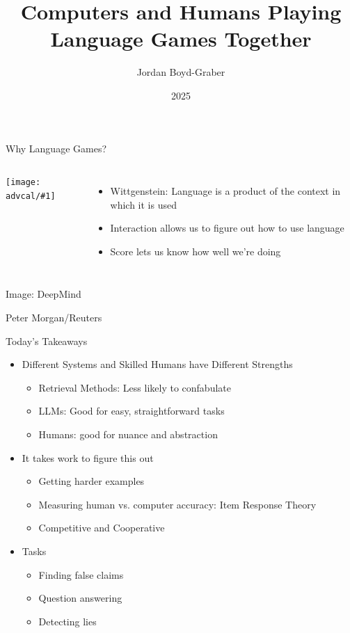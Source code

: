 \documentclass[compress]{beamer}
\title[]{Computers and Humans Playing Language Games Together}
\author{ Jordan Boyd-Graber}
\date{2025}
\institute[] %
{University of Maryland}
\newcommand{\fsi}[2]{
\begin{frame}[plain]
\vspace*{-1pt}
\makebox[\linewidth]{\texttt{[image: \#1]}}
\begin{center}
#2
\end{center}
\end{frame}
}
\newcommand{\gfxa}[2]{
	\begin{center}
		\texttt{[image: advcal/\#1]}
	\end{center}
}
\begin{document}
\frame{
\titlepage
\tiny
}


\begin{frame}{Why Language Games?}


  \begin{columns}


    \gfxa{wittgenstein}{.8}




    \begin{itemize}

      \item Wittgenstein: Language is a product of the context in which it is
        used
      \item Interaction allows us to figure out how to use language
        \item Score lets us know how well we're doing
    \end{itemize}


    \end{columns}

  

\end{frame}

\fsi{qb/starcraft}{Image: DeepMind}
\fsi{qb/DeepBlue}{Peter Morgan/Reuters}

\begin{frame}{Today's Takeaways}
	\begin{itemize}
	\item Different Systems and Skilled Humans have Different Strengths
	\begin{itemize}
		\item Retrieval Methods: Less likely to confabulate
		\item LLMs: Good for easy, straightforward tasks
		\item Humans: good for nuance and abstraction
	\end{itemize}
	\item It takes work to figure this out
	\begin{itemize}
		\item Getting harder examples
		\item Measuring human vs. computer accuracy: Item Response Theory
                \item Competitive and Cooperative
	\end{itemize}
	\item Tasks
	\begin{itemize}
		\item Finding false claims
		\item Question answering
		\item Detecting lies
	\end{itemize}
	\end{itemize}
\end{frame}
\end{document}
